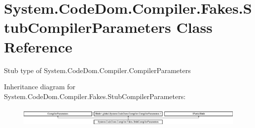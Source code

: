 \hypertarget{class_system_1_1_code_dom_1_1_compiler_1_1_fakes_1_1_stub_compiler_parameters}{\section{System.\-Code\-Dom.\-Compiler.\-Fakes.\-Stub\-Compiler\-Parameters Class Reference}
\label{class_system_1_1_code_dom_1_1_compiler_1_1_fakes_1_1_stub_compiler_parameters}
}


Stub type of System.\-Code\-Dom.\-Compiler.\-Compiler\-Parameters 


Inheritance diagram for System.\-Code\-Dom.\-Compiler.\-Fakes.\-Stub\-Compiler\-Parameters\-:\begin{figure}[H]
\begin{center}
\leavevmode
\includegraphics[height=0.979877cm]{class_system_1_1_code_dom_1_1_compiler_1_1_fakes_1_1_stub_compiler_parameters}
\end{center}
\end{figure}
